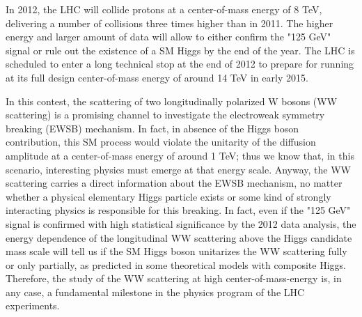 \documentclass[10pt, a4paper]{article}
\begin{document}
In 2012, the LHC will collide protons at a center-of-mass energy of 8 TeV, delivering 
a number of collisions three times higher than in 2011. The higher energy and larger 
amount of data will allow to either confirm the "125 GeV" signal or rule out the existence 
of a SM Higgs by the end of the year. The LHC is scheduled to enter a 
long technical stop at the end of 2012 to prepare for running at its full design 
center-of-mass energy of around 14 TeV in early 2015.

In this contest, the scattering of two longitudinally polarized 
W bosons (WW scattering) is a promising channel to 
investigate the electroweak symmetry breaking (EWSB) mechanism.
In fact, in absence of the Higgs boson contribution, this SM process
would violate the unitarity of the diffusion amplitude
at a center-of-mass energy of around 1 TeV; thus we know that, in this scenario, 
interesting physics must emerge at that energy scale.
Anyway, the WW scattering carries a direct information about the EWSB 
mechanism, no matter whether a physical elementary Higgs particle 
exists or some kind of strongly interacting physics is responsible for this breaking. 
In fact, even if the "125 GeV" signal is confirmed with high statistical significance by the 
2012 data analysis, the energy dependence of the longitudinal WW scattering 
above the Higgs candidate mass scale will tell us if the SM Higgs boson 
unitarizes the WW scattering fully or only partially, as predicted in some 
theoretical models with composite Higgs. Therefore, the study of the WW scattering 
at high center-of-mass-energy is, in any case, a fundamental milestone 
in the physics program of the LHC experiments. \\
\end{document}
